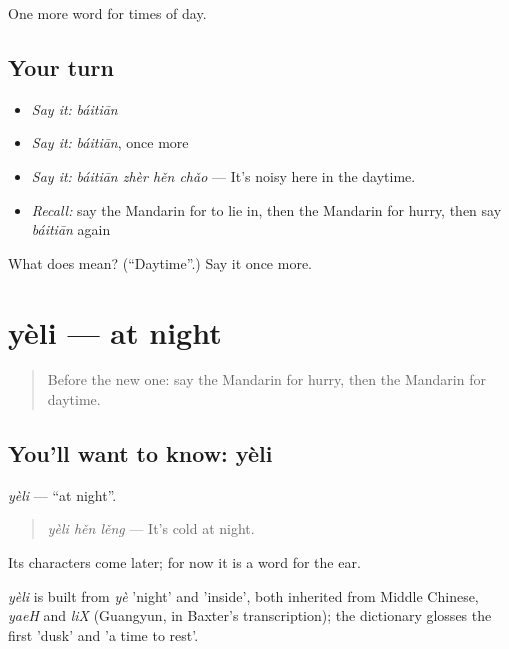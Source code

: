 \begin{grammarlens}[title={What you've built}]
One more word for times of day.
\end{grammarlens}

\subsection*{Your turn}
\begin{itemize}
\raggedright
  \item \emph{Say it:} \emph{báitiān}
  \item \emph{Say it:} \emph{báitiān}, once more
  \item \emph{Say it:} \emph{báitiān zhèr hěn chǎo} — It's noisy here in the daytime.
  \item \emph{Recall:} say the Mandarin for to lie in, then the Mandarin for hurry, then say \emph{báitiān} again
\end{itemize}

\begin{tcolorbox}[breakable,colback=teal!4,colframe=teal!35!black,title={Before you move on}]
What does  mean? (\textquotedblleft{}Daytime\textquotedblright{}.) Say it once more.
\end{tcolorbox}
\section[yèli]{yèli — at night}

\label{lesson:ZH-C146-yeli}



\begin{quote}
Before the new one: say the Mandarin for hurry, then the Mandarin for daytime.
\end{quote}

\subsection*{You'll want to know: yèli}
\emph{yèli} — \textquotedblleft{}at night\textquotedblright{}.

\begin{quote}
\emph{yèli hěn lěng} — It's cold at night.
\end{quote}

Its characters come later; for now it is a word for the ear.

\begin{cousinweb}
\emph{yèli} is built from \emph{yè} 'night' and  'inside', both inherited from Middle Chinese, \emph{yaeH} and \emph{liX} (Guangyun, in Baxter's transcription); the dictionary glosses the first 'dusk' and 'a time to rest'.
\end{cousinweb}

